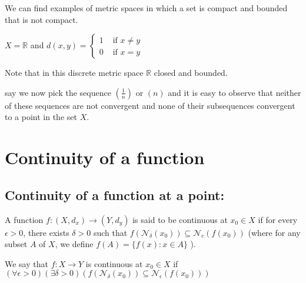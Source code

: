 \documentclass[12pt,a4paper]{article}
\begin{document}
We can find examples of metric spaces in which a set is compact and bounded that is not compact.

\(X = \mathbb{R}\) and \(d(x,y)=\begin{cases}1 & \text{ if } x \neq y\\
    0 & \text{ if } x=y \end{cases}\) 
    
Note that in this discrete metric space \(\mathbb{R}\) closed and bounded.

say we now pick the sequence \(\left( \frac{1}{n} \right) \) or \((n)\) and it is easy to observe that neither of these sequences are not convergent and none of their subsequences convergent  to a point in the set \(X\).    

\section{Continuity of a function}
\subsection{Continuity of a function at a point:}
A function \(f: (X,d_{x}) \rightarrow (Y,d_{y})\) is said to be continuous at \(x_0 \in X\) if for every \(\epsilon>0\), there exists \(\delta>0\) such that \(f\left(\mathcal{N}_\delta\left(x_0\right)\right) \subseteq \mathcal{N}_c\left(f\left(x_0\right)\right)\) (where for any subset \(A\) of \(X\), we define \(f(A)=\{f(x): x \in A\}\) ).

We say that \(f: X \to Y\) is continuous at \(x_{0} \in X\) if \((\forall \epsilon > 0)(\exists \delta > 0)(f(\mathcal{N}_{\delta}(x_{0})) \subseteq \mathcal{N}_{\epsilon}(f(x_{0})))\)  
\end{document}
